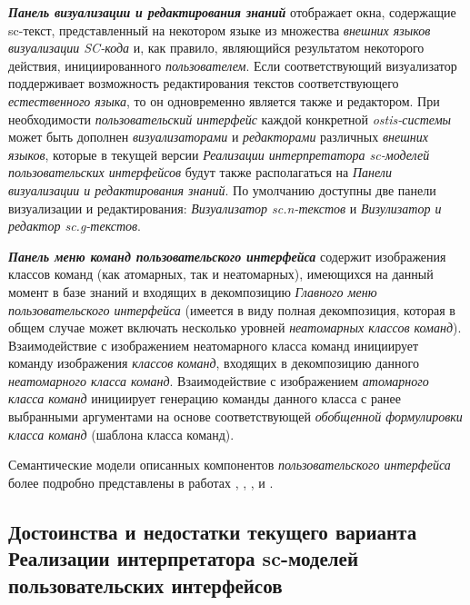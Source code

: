 \textbf{\textit{Панель визуализации и редактирования знаний}} отображает окна, содержащие sc-текст, представленный на некотором языке из множества \textit{внешних языков визуализации SC-кода} и, как правило, являющийся результатом некоторого действия, инициированного \textit{пользователем}. Если соответствующий визуализатор поддерживает возможность редактирования текстов соответствующего \textit{естественного языка}, то он одновременно является также и редактором. При необходимости \textit{пользовательский интерфейс} каждой конкретной \textit{ostis-системы} может быть дополнен \textit{визуализаторами} и \textit{редакторами} различных \textit{внешних языков}, которые в текущей версии \textit{Реализации интерпретатора sc-моделей пользовательских интерфейсов} будут также располагаться на \textit{Панели визуализации и редактирования знаний}. По умолчанию доступны две панели визуализации и редактирования: \textit{Визуализатор sc.n-текстов} и \textit{Визулизатор и редактор sc.g-текстов}.

\textbf{\textit{Панель меню команд пользовательского интерфейса}} содержит изображения классов команд (как атомарных, так и неатомарных), имеющихся на данный момент в базе знаний и входящих в декомпозицию \textit{Главного меню пользовательского интерфейса} (имеется в виду полная декомпозиция, которая в общем случае может включать несколько уровней \textit{неатомарных классов команд}). Взаимодействие с изображением неатомарного класса команд инициирует команду изображения \textit{классов} \textit{команд}, входящих в декомпозицию данного \textit{неатомарного класса команд}. Взаимодействие с изображением \textit{атомарного класса команд} инициирует генерацию команды данного класса с ранее выбранными аргументами на основе соответствующей \textit{обобщенной формулировки класса команд} (шаблона класса команд).

Семантические модели описанных компонентов \textit{пользовательского интерфейса} более подробно представлены в работах , , ,  и .

\subsection{Достоинства и недостатки текущего варианта Реализации интерпретатора sc-моделей пользовательских интерфейсов}
\label{sec_soft_platform_sci_machine_problems}

